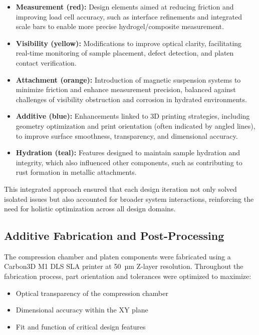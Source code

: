 \begin{itemize}
    \item \textbf{Measurement (red):} Design elements aimed at reducing friction and improving load cell accuracy, such as interface refinements and integrated scale bars to enable more precise hydrogel/composite measurement.
    \item \textbf{Visibility (yellow):} Modifications to improve optical clarity, facilitating real-time monitoring of sample placement, defect detection, and platen contact verification.
    \item \textbf{Attachment (orange):} Introduction of magnetic suspension systems to minimize friction and enhance measurement precision, balanced against challenges of visibility obstruction and corrosion in hydrated environments.
    \item \textbf{Additive (blue):} Enhancements linked to 3D printing strategies, including geometry optimization and print orientation (often indicated by angled lines), to improve surface smoothness, transparency, and dimensional accuracy.
    \item \textbf{Hydration (teal):} Features designed to maintain sample hydration and integrity, which also influenced other components, such as contributing to rust formation in metallic attachments.
\end{itemize}

This integrated approach ensured that each design iteration not only solved isolated issues but also accounted for broader system interactions, reinforcing the need for holistic optimization across all design domains.

\subsection{Additive Fabrication and Post-Processing}

The compression chamber and platen components were fabricated using a Carbon3D M1 DLS SLA printer at 50~µm Z-layer resolution. Throughout the fabrication process, part orientation and tolerances were optimized to maximize:

\begin{itemize}
    \item Optical transparency of the compression chamber
    \item Dimensional accuracy within the XY plane
    \item Fit and function of critical design features
\end{itemize}

